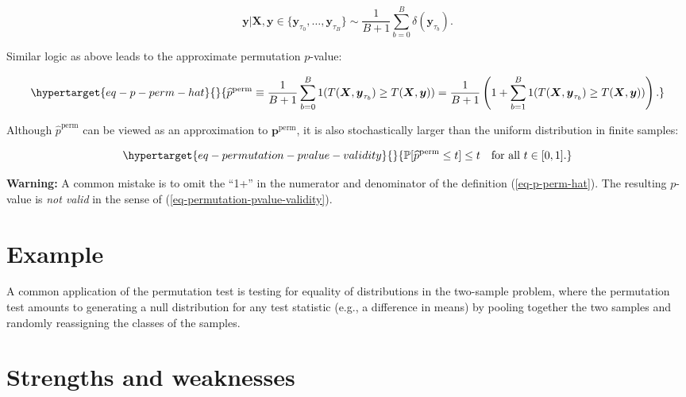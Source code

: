 \documentclass[
  11pt,
  letterpaper,
  oneside]{book}
\theoremstyle{definition}
\theoremstyle{plain}
\theoremstyle{plain}
\theoremstyle{plain}
\theoremstyle{remark}
\begin{document}
\[
\boldsymbol{y} | \boldsymbol{X}, \boldsymbol{y} \in \{\boldsymbol{y}_{\tau_0}, \dots, \boldsymbol{y}_{\tau_B}\} \sim \frac{1}{B+1}\sum_{b = 0}^B \delta(\boldsymbol{y}_{\tau_b}).
\]

Similar logic as above leads to the approximate permutation \(p\)-value:

\begin{equation}\protect\hypertarget{eq-p-perm-hat}{}{
\widehat{p}^{\text{perm}} \equiv \frac{1}{B+1}\sum_{b = 0}^B 1(T(\boldsymbol{X}, \boldsymbol{y}_{\tau_b}) \geq T(\boldsymbol{X}, \boldsymbol{y})) = \frac{1}{B+1}\left(1 + \sum_{b = 1}^B 1(T(\boldsymbol{X}, \boldsymbol{y}_{\tau_b}) \geq T(\boldsymbol{X}, \boldsymbol{y}))\right).
}\label{eq-p-perm-hat}\end{equation}

Although \(\widehat{p}^{\text{perm}}\) can be viewed as an approximation
to \(\boldsymbol{p}^{\text{perm}}\), it is also stochastically larger
than the uniform distribution in finite samples:

\begin{equation}\protect\hypertarget{eq-permutation-pvalue-validity}{}{
\mathbb{P}[\widehat{p}^{\text{perm}} \leq t] \leq t \quad \text{for all } t \in [0,1].
}\label{eq-permutation-pvalue-validity}\end{equation}

\textbf{Warning:} A common mistake is to omit the ``1+'' in the
numerator and denominator of the definition (\ref{eq-p-perm-hat}). The
resulting \(p\)-value is \emph{not valid} in the sense of
(\ref{eq-permutation-pvalue-validity}).

\hypertarget{example}{%
\section{Example}\label{example}}

A common application of the permutation test is testing for equality of
distributions in the two-sample problem, where the permutation test
amounts to generating a null distribution for any test statistic (e.g.,
a difference in means) by pooling together the two samples and randomly
reassigning the classes of the samples.

\hypertarget{strengths-and-weaknesses}{%
\section{Strengths and weaknesses}\label{strengths-and-weaknesses}}
\end{document}
